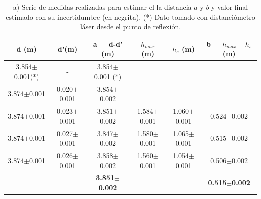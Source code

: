 \begin{table}[H]
	\centering
	\begin{minipage}{1\textwidth} 
		\centering
		\begin{tabular}{|c|c|c||c|c|c|}
			\toprule
			d (m) & d'(m) & a = d-d' (m) & $h_{max}$ (m) & $h_s$ (m) & b = $h_{max}-h_s$  (m) \\
			\hline
			3.854$\pm$0.001(*) &       -         & 3.854$\pm$0.001 (*) &  & & \\
			\hline
			3.874$\pm$0.001 & 0.020$\pm$0.001 & 3.854$\pm$0.002 &  & & \\
			\hline
			3.874$\pm$0.001 & 0.023$\pm$0.001 & 3.851$\pm$0.002 & 1.584$\pm$0.001 & 1.060$\pm$0.001 & 0.524$\pm$0.002\\
			\hline
			3.874$\pm$0.001 & 0.027$\pm$0.001 & 3.847$\pm$0.002 &1.580$\pm$0.001 & 1.065$\pm$0.001 & 0.515$\pm$0.002\\
			\hline
			3.874$\pm$0.001 & 0.026$\pm$0.001 & 3.858$\pm$0.002 &1.560$\pm$0.001 & 1.054$\pm$0.001 & 0.506$\pm$0.002\\
			\hline
			& & \textbf{3.851$\pm$0.002} & & & \textbf{0.515$\pm$0.002}\\
			\bottomrule
		\end{tabular}
		\caption{\footnotesize a) Serie de medidas realizadas para estimar el la distancia $a$ y $b$  y valor final estimado con su incertidumbre (en negrita). (*) Dato tomado con distanciómetro láser desde el punto de reflexión.}
		\label{tab:medidas_ab}
	\end{minipage}
\end{table}

